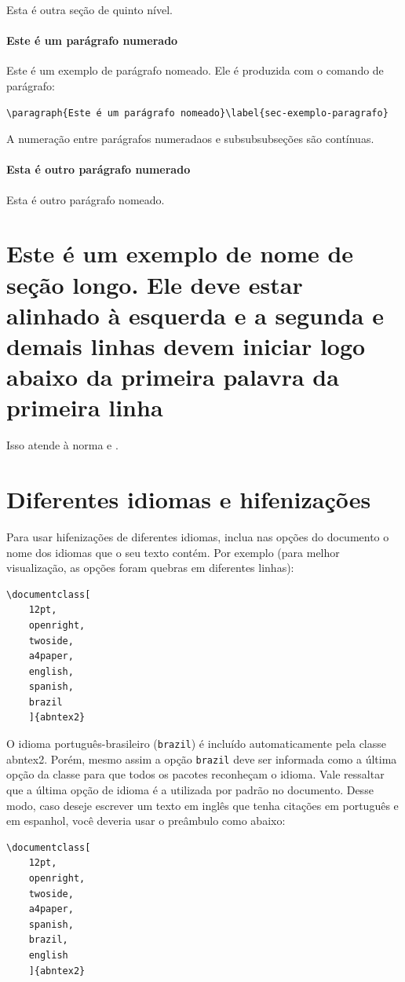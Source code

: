 Esta é outra seção de quinto nível.


\paragraph{Este é um parágrafo numerado}\label{sec-exemplo-paragrafo}

Este é um exemplo de parágrafo nomeado. Ele é produzida com o comando de
parágrafo:
\begin{verbatim}
\paragraph{Este é um parágrafo nomeado}\label{sec-exemplo-paragrafo}
\end{verbatim}

A numeração entre parágrafos numeradaos e subsubsubseções são contínuas.

\paragraph{Esta é outro parágrafo numerado}\label{sec-exemplo-paragrafo-outro}

Esta é outro parágrafo nomeado.

\section{Este é um exemplo de nome de seção longo. Ele deve estar
alinhado à esquerda e a segunda e demais linhas devem iniciar logo abaixo da
primeira palavra da primeira linha}

Isso atende à norma  
 e .

\section{Diferentes idiomas e hifenizações}
\label{sec-hifenizacao}

Para usar hifenizações de diferentes idiomas, inclua nas opções do documento o
nome dos idiomas que o seu texto contém. Por exemplo (para melhor
visualização, as opções foram quebras em diferentes linhas):
\begin{verbatim}
\documentclass[
	12pt,
	openright,
	twoside,
	a4paper,
	english,
	spanish,
	brazil
	]{abntex2}
\end{verbatim}

O idioma português-brasileiro (\texttt{brazil}) é incluído automaticamente pela
classe \textsf{abntex2}. Porém, mesmo assim a opção \texttt{brazil} deve ser
informada como a última opção da classe para que todos os pacotes reconheçam o
idioma. Vale ressaltar que a última opção de idioma é a utilizada por padrão no
documento. Desse modo, caso deseje escrever um texto em inglês que tenha
citações em português e em espanhol, você deveria usar o preâmbulo como abaixo:
\begin{verbatim}
\documentclass[
	12pt,
	openright,
	twoside,
	a4paper,
	spanish,
	brazil,
	english
	]{abntex2}
\end{verbatim}

